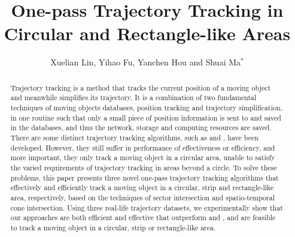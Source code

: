 \documentclass[sigconf]{acmart}
\newcommand{\ldrh}{\kw{LDRH}}
\newcommand{\grts}{\kw{GRTS}}
\begin{document}
\title{One-pass Trajectory Tracking in Circular and Rectangle-like Areas}



 \author{Xuelian Lin, Yihao Fu, Yanchen Hou and Shuai Ma$^*$}






\renewcommand{\shortauthors}{XXX et al.}


\begin{abstract}
Trajectory tracking is a method that tracks the current position of a moving object and meanwhile simplifies its trajectory. It is a combination of two fundamental techniques of moving objects databases, position tracking and trajectory simplification, in one routine such that only a small piece of position information is sent to and saved in the databases, and thus the network, storage and computing resources are saved.
%
There are some distinct trajectory tracking algorithms, such as \ldrh and \grts, have been developed. However, they still suffer in performance of effectiveness or efficiency, and more important, they only track a moving object in a circular area, unable to satisfy the varied requirements of trajectory tracking in areas beyond a circle. 
%
To solve these problems, this paper presents three novel one-pass trajectory tracking algorithms that effectively and efficiently track a moving object in a circular, strip and rectangle-like area, respectively, based on the techniques of sector intersection and spatio-temporal cone intersection.
%
Using three real-life trajectory datasets, we experimentally show that our approaches are both efficient and effective that outperform \ldrh and \grts, and are feasible to track a moving object in a circular, strip or rectangle-like area.
\end{abstract}
\end{document}
